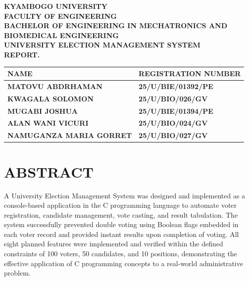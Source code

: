 \documentclass[12pt,a4paper]{article}
\begin{document}
\begin{titlepage}
  \centering
  \vspace*{1.5cm}

  {\large\bfseries KYAMBOGO UNIVERSITY}\\[0.4cm]
  {\normalsize\bfseries FACULTY OF ENGINEERING}\\[0.4cm]
  {\normalsize\bfseries BACHELOR OF ENGINEERING IN MECHATRONICS AND BIOMEDICAL ENGINEERING}\\[0.4cm]
  {\normalsize\bfseries UNIVERSITY ELECTION MANAGEMENT SYSTEM}\\[0.2cm]
  {\normalsize\bfseries REPORT.}\\[1.2cm]

  \begin{tabular}{|>{\centering\arraybackslash\bfseries}p{6cm}|>{\centering\arraybackslash\bfseries}p{6cm}|}
    \hline
    NAME & REGISTRATION NUMBER \\
    \hline
    MATOVU ABDRHAMAN & 25/U/BIE/01392/PE \\
    \hline
    KWAGALA SOLOMON & 25/U/BIO/026/GV \\
    \hline
    MUGABI JOSHUA & 25/U/BIE/01394/PE \\
    \hline
    ALAN WANI VICURI & 25/U/BIO/024/GV \\
    \hline
    NAMUGANZA MARIA GORRET & 25/U/BIO/027/GV \\
    \hline
  \end{tabular}

\end{titlepage}

\newpage
\section{ABSTRACT}

A University Election Management System was designed and implemented as a
console-based application in the C programming language to automate voter
registration, candidate management, vote casting, and result tabulation. The system
successfully prevented double voting using Boolean flags embedded in each voter
record and provided instant results upon completion of voting. All eight planned
features were implemented and verified within the defined constraints of 100 voters,
50 candidates, and 10 positions, demonstrating the effective application of C
programming concepts to a real-world administrative problem.
\end{document}
